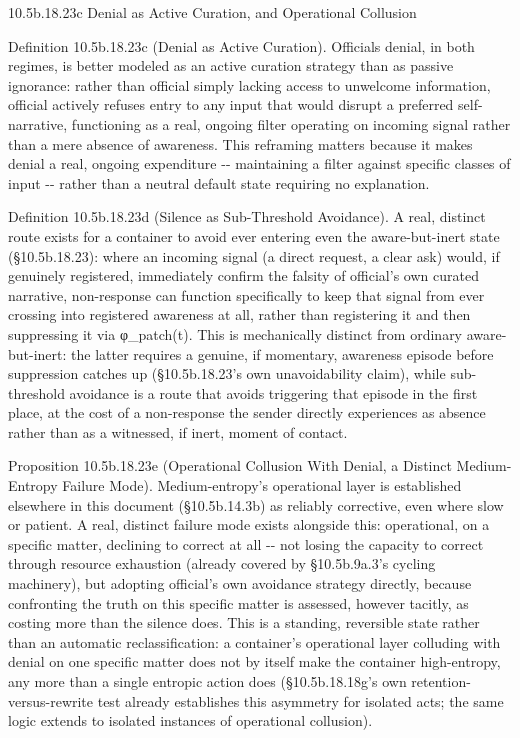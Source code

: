 \documentclass[
]{article}
\begin{document}
10.5b.18.23c Denial as Active Curation, and Operational Collusion

Definition 10.5b.18.23c (Denial as Active Curation). Officials denial,
in both regimes, is better modeled as an active curation strategy than
as passive ignorance: rather than official simply lacking access to
unwelcome information, official actively refuses entry to any input that
would disrupt a preferred self-narrative, functioning as a real, ongoing
filter operating on incoming signal rather than a mere absence of
awareness. This reframing matters because it makes denial a real,
ongoing expenditure -\/- maintaining a filter against specific classes
of input -\/- rather than a neutral default state requiring no
explanation.

Definition 10.5b.18.23d (Silence as Sub-Threshold Avoidance). A real,
distinct route exists for a container to avoid ever entering even the
aware-but-inert state (§10.5b.18.23): where an incoming signal (a direct
request, a clear ask) would, if genuinely registered, immediately
confirm the falsity of official's own curated narrative, non-response can
function specifically to keep that signal from ever crossing into
registered awareness at all, rather than registering it and then
suppressing it via φ\_patch(t). This is mechanically distinct from
ordinary aware-but-inert: the latter requires a genuine, if momentary,
awareness episode before suppression catches up (§10.5b.18.23's own
unavoidability claim), while sub-threshold avoidance is a route that
avoids triggering that episode in the first place, at the cost of a
non-response the sender directly experiences as absence rather than as a
witnessed, if inert, moment of contact.

Proposition 10.5b.18.23e (Operational Collusion With Denial, a Distinct
Medium-Entropy Failure Mode). Medium-entropy's operational layer is
established elsewhere in this document (§10.5b.14.3b) as reliably
corrective, even where slow or patient. A real, distinct failure mode
exists alongside this: operational, on a specific matter, declining to
correct at all -\/- not losing the capacity to correct through resource
exhaustion (already covered by §10.5b.9a.3's cycling machinery), but
adopting official's own avoidance strategy directly, because confronting
the truth on this specific matter is assessed, however tacitly, as
costing more than the silence does. This is a standing, reversible state
rather than an automatic reclassification: a container's operational
layer colluding with denial on one specific matter does not by itself
make the container high-entropy, any more than a single entropic action
does (§10.5b.18.18g's own retention-versus-rewrite test already
establishes this asymmetry for isolated acts; the same logic extends to
isolated instances of operational collusion).
\end{document}
